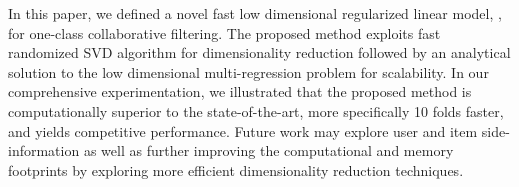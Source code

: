 
In this paper, we defined a novel fast low dimensional regularized linear model, \LinearLow, for one-class collaborative filtering. The proposed method exploits fast randomized SVD algorithm for dimensionality reduction followed by an analytical solution to the low dimensional multi-regression problem for scalability. In our comprehensive experimentation, we illustrated that the proposed method is computationally superior to the state-of-the-art, more specifically 10 folds faster, and yields competitive performance. Future work may explore user and item side-information as well as further improving the computational and memory footprints by exploring more efficient dimensionality reduction techniques.